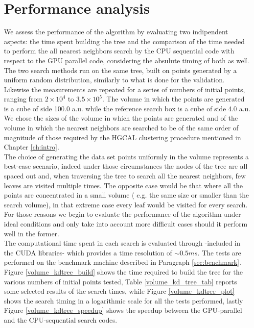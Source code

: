 \section{Performance analysis}\label{sec:volumeKd_performance}
We assess the performance of the algorithm by evaluating two indipendent aspects: the time spent building the tree and the comparison of the time needed to perform the all nearest neighbors search by the CPU sequential code with respect to the GPU parallel code, considering the absulute timing of both as well.\\
The two search methods run on the same tree, built on points generated by a uniform random distribution, similarly to what is done for the validation. Likewise the measurements are repeated for a series of numbers of initial points, ranging from  $2 \times 10^{4}$ to $3.5 \times 10^{5}$. The volume in which the points are generated is a cube of side 100.0 a.u. while the reference search box is a cube of side 4.0 a.u.\\
We chose the sizes of the volume in which the points are generated and of the volume in which the nearest neighbors are searched to be of the same order of magnitude of those required by the HGCAL clustering procedure mentioned in Chapter \ref{ch:intro}.\\
The choice of generating the data set points uniformly in the volume represents a best-case scenario, indeed under those circumstances the nodes of the tree are all spaced out and, when traversing the tree to search all the nearest neighbors, few leaves are visited multiple times. The opposite case would be that where all the points are concentrated in a small volume ( e.g. the same size or smaller than the search volume), in that extreme case every leaf would be visited for every search. For those reasons we begin to evaluate the performance of the algorithm under ideal conditions and only take into account more difficult cases should it perform well in the former.\\
The computational time spent in each search is evaluated through  -included in the CUDA libraries- which provides a time resolution of $\sim 0.5\unit{ms}$. The tests are performed on the benchmark machine described in Paragraph \ref{sec:benchmark}.\\
Figure \ref{volume_kdtree_build} shows the time required to build the tree for the various numbers of initial points tested, Table \ref{volume_kd_tree_tab} reports some selected results of the search times, while Figure \ref{volume_kdtree_plot} shows the search timing in a logarithmic scale for all the tests performed, lastly Figure \ref{volume_kdtree_speedup} shows the speedup between the GPU-parallel and the CPU-sequential search codes.\\

